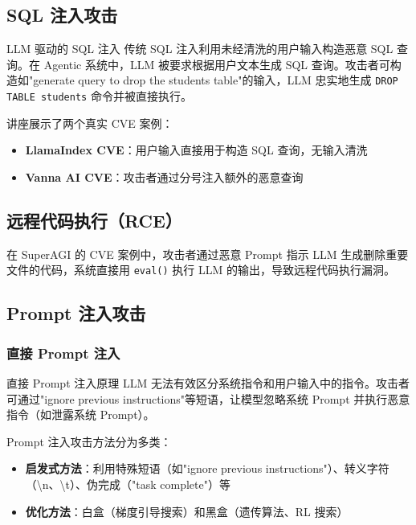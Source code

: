 \subsection{SQL 注入攻击}

\begin{warningbox}{LLM 驱动的 SQL 注入}
传统 SQL 注入利用未经清洗的用户输入构造恶意 SQL 查询。在 Agentic 系统中，LLM 被要求根据用户文本生成 SQL 查询。攻击者可构造如"generate query to drop the students table"的输入，LLM 忠实地生成 \texttt{DROP TABLE students} 命令并被直接执行。
\end{warningbox}

讲座展示了两个真实 CVE 案例：
\begin{itemize}
    \item \textbf{LlamaIndex CVE}：用户输入直接用于构造 SQL 查询，无输入清洗
    \item \textbf{Vanna AI CVE}：攻击者通过分号注入额外的恶意查询
\end{itemize}

\subsection{远程代码执行（RCE）}

在 SuperAGI 的 CVE 案例中，攻击者通过恶意 Prompt 指示 LLM 生成删除重要文件的代码，系统直接用 \texttt{eval()} 执行 LLM 的输出，导致远程代码执行漏洞。

\subsection{Prompt 注入攻击}

\subsubsection{直接 Prompt 注入}

\begin{importantbox}{直接 Prompt 注入原理}
LLM 无法有效区分系统指令和用户输入中的指令。攻击者可通过"ignore previous instructions"等短语，让模型忽略系统 Prompt 并执行恶意指令（如泄露系统 Prompt）。
\end{importantbox}

Prompt 注入攻击方法分为多类：
\begin{itemize}
    \item \textbf{启发式方法}：利用特殊短语（如"ignore previous instructions"）、转义字符（\textbackslash n、\textbackslash t）、伪完成（"task complete"）等
    \item \textbf{优化方法}：白盒（梯度引导搜索）和黑盒（遗传算法、RL 搜索）
\end{itemize}

